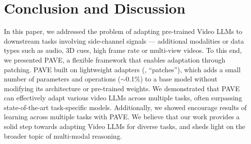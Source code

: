 \section{Conclusion and Discussion}
\label{sec:conclusion}





In this paper, we addressed the problem of adapting pre-trained Video LLMs to downstream tasks involving side-channel signals --- additional modalities or data types such as audio, 3D cues, high frame rate or multi-view videos.  
% 
To this end, we presented PAVE, a flexible framework that enables adaptation through patching. 
%
PAVE built on lightweight adapters (\ie, ``patches''), which adds a small number of parameters and operations ($\sim$0.1\%) to a base model without modifying its architecture or pre-trained weights.
%
We demonstrated that PAVE can effectively adapt various video LLMs across multiple tasks, often surpassing state-of-the-art task-specific models. 
%
Additionally, we showed encourage results of learning across multiple tasks with PAVE.
%
We believe that our work provides a solid step towards adapting Video LLMs for diverse tasks, and sheds light on the broader topic of multi-modal reasoning.

